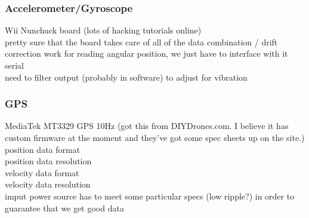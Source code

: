 \documentclass{article}
\begin{document}
\subsubsection{Accelerometer/Gyroscope}
Wii Nunchuck board (lots of hacking tutorials online)\\
pretty sure that the board takes care of all of the data combination / drift correction work for reading angular position, we just have to interface with it serial\\
need to filter output (probably in software) to adjust for vibration\\

\subsubsection{GPS}
MediaTek MT3329 GPS 10Hz (got this from DIYDrones.com.  I believe it has custom firmware at the moment and they've got some spec sheets up on the site.)\\
position data format\\
position data resolution\\
velocity data format\\
velocity data resolution\\
imput power source has to meet some particular specs (low ripple?) in order to guarantee that we get good data\\
\end{document}
